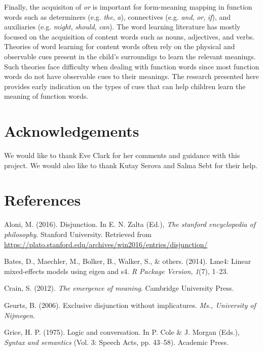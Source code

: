 \documentclass[10pt, letterpaper]{article}
\begin{document}
Finally, the acquisiton of \emph{or} is important for form-meaning
mapping in function words such as determiners (e.g. \emph{the},
\emph{a}), connectives (e.g. \emph{and}, \emph{or}, \emph{if}), and
auxiliaries (e.g. \emph{might}, \emph{should}, \emph{can}). The word
learning literature has mostly focused on the acquisition of content
words such as nouns, adjectives, and verbs. Theories of word learning
for content words often rely on the physical and observable cues present
in the child's surroundigs to learn the relevant meanings. Such theories
face difficulty when dealing with function words since most function
words do not have observable cues to their meanings. The research
presented here provides early indication on the types of cues that can
help children learn the meaning of function words.

\section{Acknowledgements}\label{acknowledgements}

We would like to thank Eve Clark for her comments and guidance with this
project. We would also like to thank Kutay Serova and Salma Sebt for
their help.

\section{References}\label{references}

\setlength{\parindent}{-0.1in} \setlength{\leftskip}{0.125in} \noindent

\hypertarget{refs}{}
\hypertarget{ref-Aloni2016}{}
Aloni, M. (2016). Disjunction. In E. N. Zalta (Ed.), \emph{The stanford
encyclopedia of philosophy}. Stanford University. Retrieved from
\url{https://plato.stanford.edu/archives/win2016/entries/disjunction/}

\hypertarget{ref-bates2014lme4}{}
Bates, D., Maechler, M., Bolker, B., Walker, S., \& others. (2014).
Lme4: Linear mixed-effects models using eigen and s4. \emph{R Package
Version}, \emph{1}(7), 1--23.

\hypertarget{ref-crain2012emergence}{}
Crain, S. (2012). \emph{The emergence of meaning}. Cambridge University
Press.

\hypertarget{ref-geurts2006exclusive}{}
Geurts, B. (2006). Exclusive disjunction without implicatures.
\emph{Ms., University of Nijmegen}.

\hypertarget{ref-grice1975logicconvo}{}
Grice, H. P. (1975). Logic and conversation. In P. Cole \& J. Morgan
(Eds.), \emph{Syntax and semantics} (Vol. 3: Speech Acts, pp. 43--58).
Academic Press.
\end{document}
